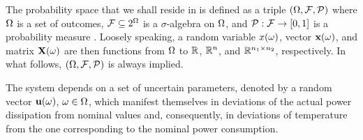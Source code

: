 The probability space that we shall reside in is defined as a triple $(\Omega, \mathcal{F}, \mathcal{P})$ where $\Omega$ is a set of outcomes, $\mathcal{F} \subseteq 2^\Omega$ is a $\sigma$-algebra on $\Omega$, and $\mathcal{P}: \mathcal{F} \to [0, 1]$ is a probability measure \cite{maitre2010}.
Loosely speaking, a random variable $x(\omega)$, vector $\mathbf{x}(\omega)$, and matrix $\mathbf{X}(\omega)$ are then functions from $\Omega$ to $\mathbb{R}$, $\mathbb{R}^n$, and $\mathbb{R}^{n_1 \times n_2}$, respectively.
In what follows, $(\Omega, \mathcal{F}, \mathcal{P})$ is always implied.

The system depends on a set of uncertain parameters, denoted by a random vector $\mathbf{u}(\omega)$, $\omega \in \Omega$, which manifest themselves in deviations of the actual power dissipation from nominal values and, consequently, in deviations of temperature from the one corresponding to the nominal power consumption.
